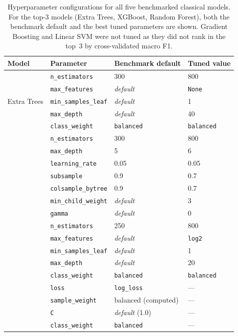 \begin{table}[H]
\centering
\caption{Hyperparameter configurations for all five benchmarked classical
models. For the top-3 models (Extra Trees, XGBoost, Random Forest), both
the benchmark default and the best tuned parameters are shown. Gradient
Boosting and Linear SVM were not tuned as they did not rank in the
top~3 by cross-validated macro F1.}
\label{tab:hyperparams}
\small
\begin{tabular}{@{}llll@{}}
\toprule
\textbf{Model} & \textbf{Parameter} & \textbf{Benchmark default} &
\textbf{Tuned value} \\
\midrule

\multirow{5}{*}{Extra Trees}
  & \texttt{n\_estimators}      & 300               & 800 \\
  & \texttt{max\_features}      & \textit{default}  & \texttt{None} \\
  & \texttt{min\_samples\_leaf} & \textit{default}  & 1 \\
  & \texttt{max\_depth}         & \textit{default}  & 40 \\
  & \texttt{class\_weight}      & \texttt{balanced} & \texttt{balanced} \\
\addlinespace

\multirow{7}{*}{XGBoost}
  & \texttt{n\_estimators}      & 300  & 800 \\
  & \texttt{max\_depth}         & 5    & 6 \\
  & \texttt{learning\_rate}     & 0.05 & 0.05 \\
  & \texttt{subsample}          & 0.9  & 0.7 \\
  & \texttt{colsample\_bytree}  & 0.9  & 0.7 \\
  & \texttt{min\_child\_weight} & \textit{default} & 3 \\
  & \texttt{gamma}              & \textit{default} & 0 \\
\addlinespace

\multirow{5}{*}{Random Forest}
  & \texttt{n\_estimators}      & 250               & 800 \\
  & \texttt{max\_features}      & \textit{default}  & \texttt{log2} \\
  & \texttt{min\_samples\_leaf} & \textit{default}  & 1 \\
  & \texttt{max\_depth}         & \textit{default}  & 20 \\
  & \texttt{class\_weight}      & \texttt{balanced} & \texttt{balanced} \\
\addlinespace

\multirow{2}{*}{Gradient Boosting}
  & \texttt{loss}           & \texttt{log\_loss}  & --- \\
  & \texttt{sample\_weight} & balanced (computed) & --- \\
\addlinespace

\multirow{2}{*}{Linear SVM}
  & \texttt{C}              & \textit{default} (1.0) & --- \\
  & \texttt{class\_weight}  & \texttt{balanced}      & --- \\

\bottomrule
\end{tabular}
\normalsize
\end{table}


